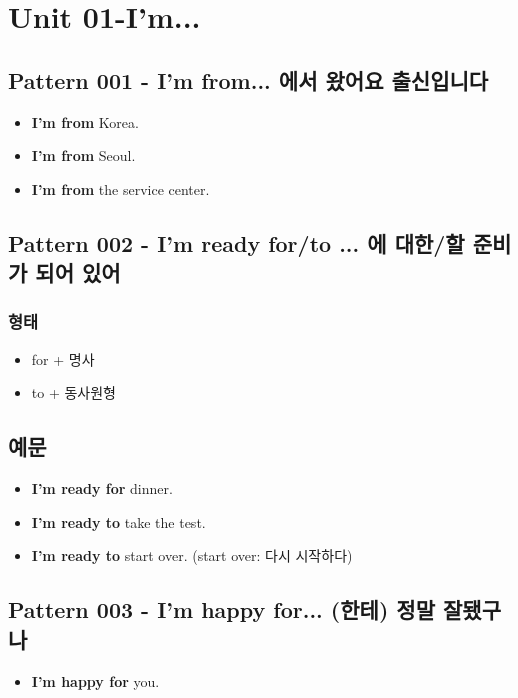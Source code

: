 \documentclass[11pt]{oblivoir}
\begin{document}
\section{Unit 01-I'm...}

\subsection{Pattern 001 - I'm from... \texttildelow 에서 왔어요 출신입니다}
\begin{itemize}
  \item \textbf{I'm from} Korea.
  \item \textbf{I'm from} Seoul.
  \item \textbf{I'm from} the service center.
\end{itemize}

\subsection{Pattern 002 - I'm ready for/to ... \texttildelow 에 대한/\texttildelow 할 준비가 되어 있어}
\subsubsection{형태}
\begin{itemize}
  \item for + 명사
  \item to + 동사원형
\end{itemize}

\subsection{예문}
\begin{itemize}
  \item \textbf{I'm ready for} dinner.
  \item \textbf{I'm ready to} take the test.
  \item \textbf{I'm ready to} start over. (start over: 다시 시작하다)
\end{itemize}

\subsection{Pattern 003 - I'm happy for... (\texttildelow 한테) 정말 잘됐구나}

\begin{itemize}
  \item \textbf{I'm happy for} you.
\end{itemize}
\end{document}
